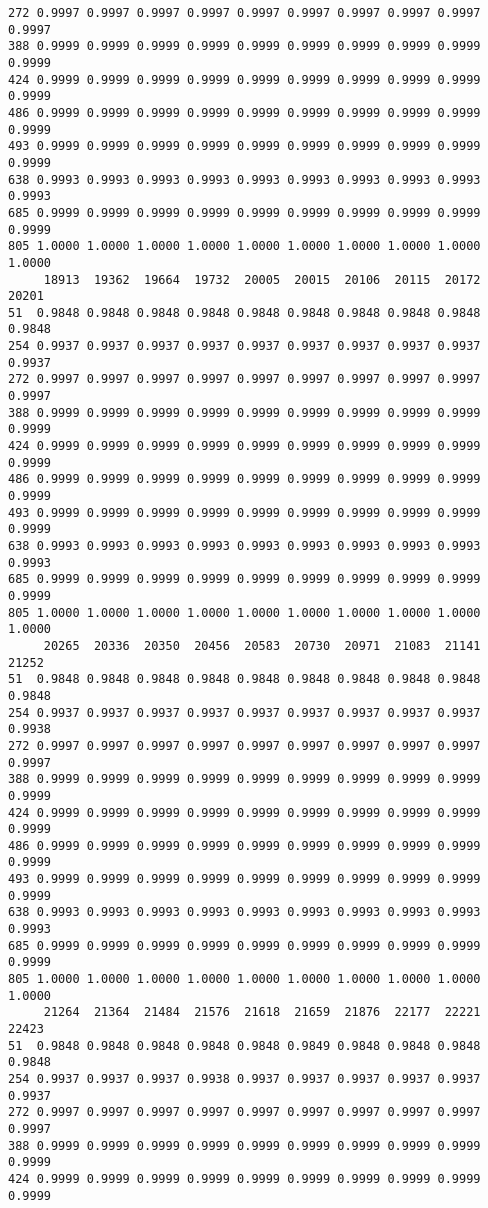 \documentclass[
]{report}
\begin{document}
\begin{verbatim}
272 0.9997 0.9997 0.9997 0.9997 0.9997 0.9997 0.9997 0.9997 0.9997 0.9997
388 0.9999 0.9999 0.9999 0.9999 0.9999 0.9999 0.9999 0.9999 0.9999 0.9999
424 0.9999 0.9999 0.9999 0.9999 0.9999 0.9999 0.9999 0.9999 0.9999 0.9999
486 0.9999 0.9999 0.9999 0.9999 0.9999 0.9999 0.9999 0.9999 0.9999 0.9999
493 0.9999 0.9999 0.9999 0.9999 0.9999 0.9999 0.9999 0.9999 0.9999 0.9999
638 0.9993 0.9993 0.9993 0.9993 0.9993 0.9993 0.9993 0.9993 0.9993 0.9993
685 0.9999 0.9999 0.9999 0.9999 0.9999 0.9999 0.9999 0.9999 0.9999 0.9999
805 1.0000 1.0000 1.0000 1.0000 1.0000 1.0000 1.0000 1.0000 1.0000 1.0000
     18913  19362  19664  19732  20005  20015  20106  20115  20172  20201
51  0.9848 0.9848 0.9848 0.9848 0.9848 0.9848 0.9848 0.9848 0.9848 0.9848
254 0.9937 0.9937 0.9937 0.9937 0.9937 0.9937 0.9937 0.9937 0.9937 0.9937
272 0.9997 0.9997 0.9997 0.9997 0.9997 0.9997 0.9997 0.9997 0.9997 0.9997
388 0.9999 0.9999 0.9999 0.9999 0.9999 0.9999 0.9999 0.9999 0.9999 0.9999
424 0.9999 0.9999 0.9999 0.9999 0.9999 0.9999 0.9999 0.9999 0.9999 0.9999
486 0.9999 0.9999 0.9999 0.9999 0.9999 0.9999 0.9999 0.9999 0.9999 0.9999
493 0.9999 0.9999 0.9999 0.9999 0.9999 0.9999 0.9999 0.9999 0.9999 0.9999
638 0.9993 0.9993 0.9993 0.9993 0.9993 0.9993 0.9993 0.9993 0.9993 0.9993
685 0.9999 0.9999 0.9999 0.9999 0.9999 0.9999 0.9999 0.9999 0.9999 0.9999
805 1.0000 1.0000 1.0000 1.0000 1.0000 1.0000 1.0000 1.0000 1.0000 1.0000
     20265  20336  20350  20456  20583  20730  20971  21083  21141  21252
51  0.9848 0.9848 0.9848 0.9848 0.9848 0.9848 0.9848 0.9848 0.9848 0.9848
254 0.9937 0.9937 0.9937 0.9937 0.9937 0.9937 0.9937 0.9937 0.9937 0.9938
272 0.9997 0.9997 0.9997 0.9997 0.9997 0.9997 0.9997 0.9997 0.9997 0.9997
388 0.9999 0.9999 0.9999 0.9999 0.9999 0.9999 0.9999 0.9999 0.9999 0.9999
424 0.9999 0.9999 0.9999 0.9999 0.9999 0.9999 0.9999 0.9999 0.9999 0.9999
486 0.9999 0.9999 0.9999 0.9999 0.9999 0.9999 0.9999 0.9999 0.9999 0.9999
493 0.9999 0.9999 0.9999 0.9999 0.9999 0.9999 0.9999 0.9999 0.9999 0.9999
638 0.9993 0.9993 0.9993 0.9993 0.9993 0.9993 0.9993 0.9993 0.9993 0.9993
685 0.9999 0.9999 0.9999 0.9999 0.9999 0.9999 0.9999 0.9999 0.9999 0.9999
805 1.0000 1.0000 1.0000 1.0000 1.0000 1.0000 1.0000 1.0000 1.0000 1.0000
     21264  21364  21484  21576  21618  21659  21876  22177  22221  22423
51  0.9848 0.9848 0.9848 0.9848 0.9848 0.9849 0.9848 0.9848 0.9848 0.9848
254 0.9937 0.9937 0.9937 0.9938 0.9937 0.9937 0.9937 0.9937 0.9937 0.9937
272 0.9997 0.9997 0.9997 0.9997 0.9997 0.9997 0.9997 0.9997 0.9997 0.9997
388 0.9999 0.9999 0.9999 0.9999 0.9999 0.9999 0.9999 0.9999 0.9999 0.9999
424 0.9999 0.9999 0.9999 0.9999 0.9999 0.9999 0.9999 0.9999 0.9999 0.9999

\end{verbatim}
\end{document}

